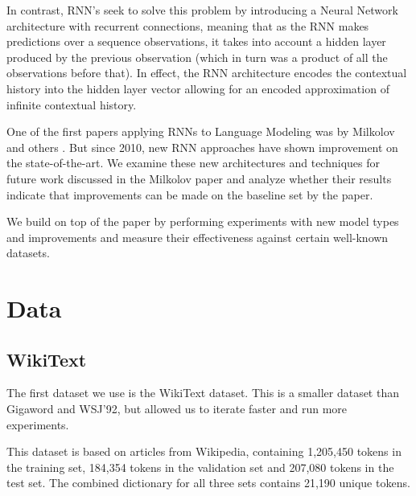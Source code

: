 \documentclass[a4paper]{article}
\begin{document}
In contrast, RNN's seek to solve this problem by introducing a Neural Network
architecture with recurrent connections, meaning that as the RNN makes predictions
over a sequence observations, it takes into account a hidden layer produced
by the previous observation (which in turn was a product of all the observations
before that). In effect, the RNN architecture encodes the contextual history
into the hidden layer vector allowing for an encoded approximation of infinite
contextual history.

One of the first papers applying RNNs to Language Modeling was by Milkolov and others \cite{Milkolov10}.
But since 2010, new RNN approaches have shown improvement on the state-of-the-art.
We examine these new architectures and techniques for future work discussed in the
Milkolov paper and analyze whether their results indicate that improvements can be made
on the baseline set by the paper.

We build on top of the paper by performing experiments with new model types
and improvements and measure their effectiveness against certain well-known datasets.

\section{Data}
\label{sec:data}

\subsection{WikiText}
\label{sec:wikitext}

The first dataset we use is the WikiText dataset. This is a smaller dataset than
Gigaword and WSJ'92, but allowed us to
iterate faster and run more experiments.

This dataset is based on articles from Wikipedia, containing 1,205,450 tokens in
the training set, 184,354 tokens in the validation set and 207,080 tokens
in the test set. The combined dictionary for all three sets contains 21,190
unique tokens.
\end{document}
